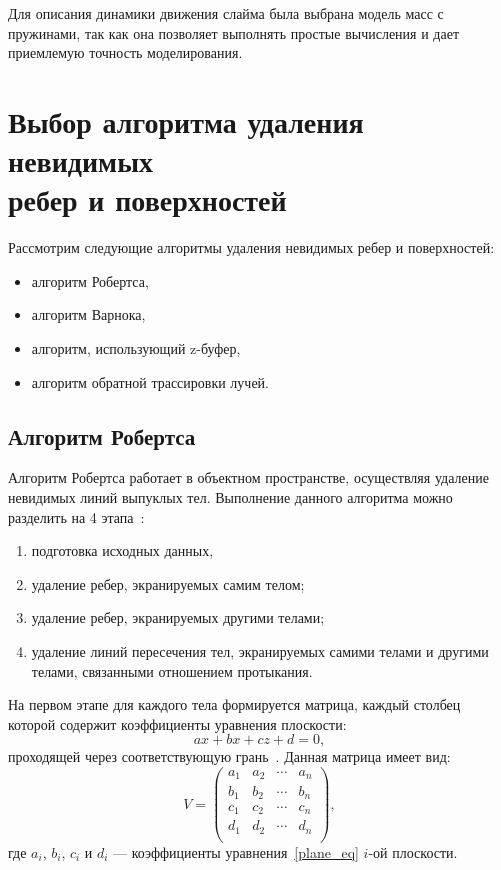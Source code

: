 Для описания динамики движения слайма была выбрана модель масс с
пружинами, так как она позволяет выполнять простые вычисления и дает
приемлемую точность моделирования.

\section{Выбор алгоритма удаления невидимых\\ребер и поверхностей}

Рассмотрим следующие алгоритмы удаления невидимых ребер и поверхностей:

\begin{itemize}
	\item алгоритм Робертса,
	\item алгоритм Варнока,
	\item алгоритм, использующий z-буфер,
	\item алгоритм обратной трассировки лучей.
\end{itemize}

\subsection{Алгоритм Робертса}

Алгоритм Робертса работает в объектном пространстве, осуществляя
удаление невидимых линий выпуклых тел. Выполнение данного алгоритма можно
разделить на 4 этапа~\cite{rojers}:

\begin{enumerate}
	\item подготовка исходных данных,
	\item удаление ребер, экранируемых самим телом;
	\item удаление ребер, экранируемых другими телами;
	\item удаление линий пересечения тел, экранируемых самими телами и другими телами, связанными отношением протыкания.
\end{enumerate}

На первом этапе для каждого тела формируется матрица, каждый столбец
которой содержит коэффициенты уравнения плоскости:
\begin{equation}\label{plane_eq}
	ax + bx + cz + d = 0,
\end{equation}
проходящей через соответствующую грань~\cite{rojers}. Данная матрица имеет вид:
$$
V =
\begin{pmatrix}
	a_1 & a_2 & \cdots & a_n \\
	b_1 & b_2 & \cdots & b_n \\
	c_1 & c_2 & \cdots & c_n \\
	d_1 & d_2 & \cdots & d_n \\
\end{pmatrix},
$$
где $a_i$, $b_i$, $c_i$ и $d_i$ --- коэффициенты уравнения~\eqref{plane_eq} $i$-ой плоскости.


